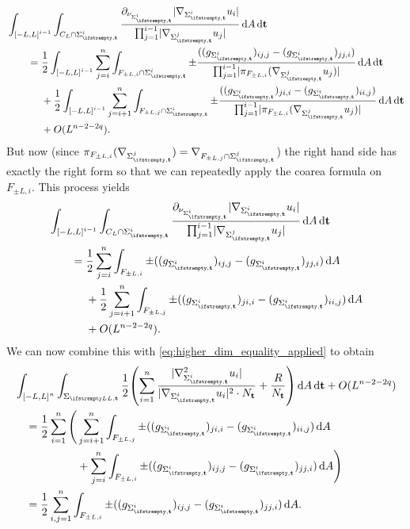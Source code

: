 \documentclass[draft]{amsart}
\newcommand*{\mathfullstop}{.}
\DeclarePairedDelimiter{\parens}{(}{)}
\let\p\parens %
\DeclarePairedDelimiter{\abs}{\lvert}{\rvert} %
\begin{document}
\begin{align*}
    &\int_{\interval{-L}{L}^{i-1}}\int_{C_L\cap \nls^i}\frac{\partial_{\nu_{\nls^i}}\abs{\nabla_{\nls^i}u_i}}{\prod_{j=1}^{i-1}\abs{\nabla_{\nls^j}u_j}}\odif{A}\odif{\vect{t}}\\
    &\qquad=\begin{aligned}[t]
        &\frac{1}{2}\int_{\interval{-L}{L}^{i-1}}\sum_{j=i}^n\int_{F_{\pm L,i}\cap \nls^i}  \pm\frac{((g_{\nls^i})_{ij,j}-(g_{\nls^i})_{jj,i})}{\prod_{j=1}^{i-1}\abs{\pi_{F_{\pm L,i}}(\nabla_{\nls^j}u_j)}}\odif{A}\odif{\vect{t}}\\
        &{}+\frac{1}{2}\int_{\interval{-L}{L}^{i-1}} \sum_{j=i+1}^n\int_{F_{\pm L,j} \cap \nls^i} \pm\frac{((g_{\nls^i})_{ji,i}-(g_{\nls^i})_{ii,j})}{\prod_{j=1}^{i-1}\abs{\pi_{F_{\pm L,i}}(\nabla_{\nls^j}u_j)}}\odif{A}\odif{\vect{t}}\\
        &{}+O(L^{n-2-2q})\mathfullstop
    \end{aligned}
\end{align*}
But now (since \( \pi_{F_{\pm L,i}}(\nabla_{\nls^j})=\nabla_{F_{\pm L,j}\cap \nls^j} \)) the right hand side has exactly the right form so that we can repeatedly apply the coarea formula on \( F_{\pm L,i} \). This process yields 
\begin{align*}
    &\int_{\interval{-L}{L}^{i-1}}\int_{C_L\cap \nls^i}\frac{\partial_{\nu_{\nls^i}}\abs{\nabla_{\nls^i}u_i}}{\prod_{j=1}^{i-1}\abs{\nabla_{\nls^j}u_j}}\odif{A}\odif{\vect{t}}\\
    &\qquad=\begin{aligned}[t]
        &\frac{1}{2} \sum_{j=i}^n \int_{F_{\pm L,i}} \pm((g_{\nls^i})_{ij,j}-(g_{\nls^i})_{jj,i})\odif{A}\\
        &{}+\frac{1}{2} \sum_{j=i+1}^n \int_{F_{\pm L,j}} \pm((g_{\nls^i})_{ji,i}-(g_{\nls^i})_{ii,j})\odif{A}\\
        &{}+O(L^{n-2-2q})\mathfullstop
    \end{aligned}
\end{align*}
We can now combine this with \cref{eq:higher_dim_equality_applied} to obtain
\begin{equation*}
    \begin{aligned}
        &\int_{\interval{-L}{L}^n}\int_{\nls[L]}\frac{1}{2}\p*{\sum_{i=1}^{n}\frac{\abs{\nabla_{\nls^i}^2 u_i}}{\abs{\nabla_{\nls^i}u_i}^2\cdot N_{\vect{t}}}+\frac{R}{N_{\vect{t}}}}\odif{A}\odif{\vect{t}}+O(L^{n-2-2q})\\
        &\quad=\frac{1}{2}\sum_{i=1}^{n}\begin{aligned}[t]
            \Bigg(&\sum_{j=i+1}^{n}\int_{F_{\pm L,j}} \pm((g_{\nls^i})_{ji,i}-(g_{\nls^i})_{ii,j})\odif{A}\\
            &{}+ \sum_{j=i}^{n}\int_{F_{\pm L,i}}\pm((g_{\nls^i})_{ij,j}-(g_{\nls^i})_{jj,i})\odif{A}\Bigg)
        \end{aligned}\\
        &\quad=\frac{1}{2}\sum_{i,j=1}^n\int_{F_{\pm L,i}}\pm((g_{\nls^i})_{ij,j}-(g_{\nls^i})_{jj,i})\odif{A}\mathfullstop
    \end{aligned}
\end{equation*}
\end{document}
